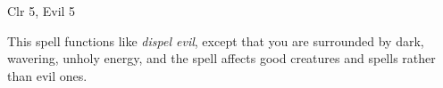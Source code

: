 
\begin{description*}
\item[Level:] Clr 5, Evil 5
\end{description*}

This spell functions like \textit{dispel evil}, except that you are surrounded
by dark, wavering, unholy energy, and the spell affects good creatures and spells
rather than evil ones.
